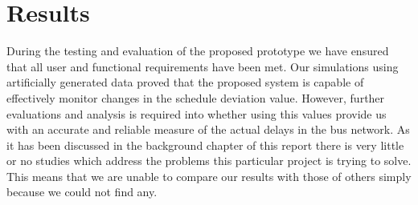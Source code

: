 \section{Results}
During the testing and evaluation of the proposed prototype we have ensured that all user and functional requirements have been met. Our simulations using artificially generated data proved that the proposed system is capable of effectively monitor changes in the schedule deviation value. However, further evaluations and analysis is required into whether using this values provide us with an accurate and reliable measure of the actual delays in the bus network. As it has been discussed in the background chapter of this report there is very little or no studies which address the problems this particular project is trying to solve. This means that we are unable to compare our results with those of others simply because we could not find any. 



